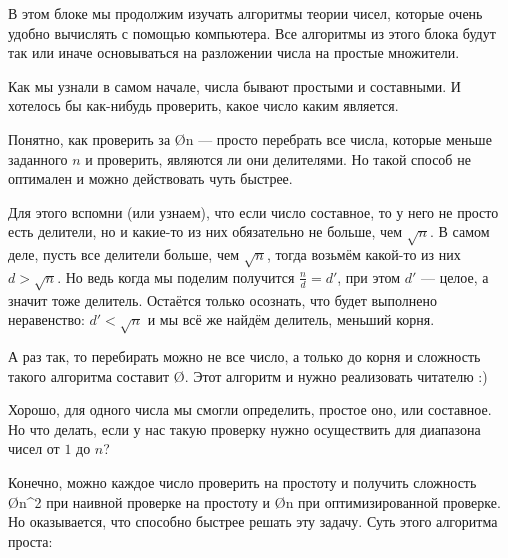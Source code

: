 В этом блоке мы продолжим изучать алгоритмы теории чисел, которые очень удобно вычислять с помощью компьютера. Все алгоритмы из этого блока будут так или иначе основываться на разложении числа на простые множители.


Как мы узнали в самом начале, числа бывают простыми и составными. И хотелось бы как-нибудь проверить, какое число каким является.

Понятно, как проверить за \O{n} — просто перебрать все числа, которые меньше заданного $n$ и проверить, являются ли они делителями. Но такой способ не оптимален и можно действовать чуть быстрее.

Для этого вспомни (или узнаем), что если число составное, то у него не просто есть делители, но и какие-то из них обязательно не больше, чем $\sqrt{n}$. В самом деле, пусть все делители больше, чем $\sqrt{n}$, тогда возьмём какой-то из них $d > \sqrt{n}$. Но ведь когда мы поделим получится $\frac{n}{d} = d'$, при этом $d'$ — целое, а значит тоже делитель. Остаётся только осознать, что будет выполнено неравенство: $d' < \sqrt{n}$ и мы всё же найдём делитель, меньший корня.

А раз так, то перебирать можно не все число, а только до корня и сложность такого алгоритма составит \O{}. Этот алгоритм и нужно реализовать читателю :)


Хорошо, для одного числа мы смогли определить, простое оно, или составное. Но что делать, если у нас такую проверку нужно осуществить для диапазона чисел от $1$ до $n$?

Конечно, можно каждое число проверить на простоту и получить сложность \O{n^2} при наивной проверке на простоту и \O{n} при оптимизированной проверке. Но оказывается, что  способно быстрее решать эту задачу. Суть этого алгоритма проста:

